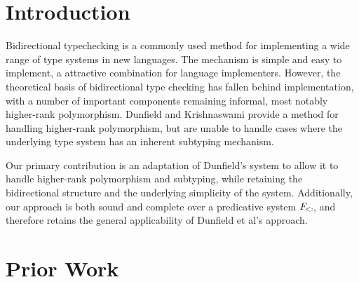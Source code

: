 \documentclass{sig-alternate}
\title{}
\author{
}
\begin{document}
\maketitle
\begin{abstract}

\end{abstract}

\section{Introduction}
Bidirectional typechecking is a commonly used method for implementing a wide range of type systems in new languages. The mechanism is simple and easy to implement, a attractive combination for language implementers. However, the theoretical basis of bidirectional type checking has fallen behind implementation, with a number of important components remaining informal, most notably higher-rank polymorphism. Dunfield and Krishnaswami provide a method for handling higher-rank polymorphism, but are unable to handle cases where the underlying type system has an inherent subtyping mechanism.

Our primary contribution is an adaptation of Dunfield's system to allow it to handle higher-rank polymorphism and subtyping, while retaining the bidirectional structure and the underlying simplicity of the system. Additionally, our approach is both sound and complete over a predicative system $F_{\st}$, and therefore retains the general applicability of Dunfield et al's approach.

\section{Prior Work}


\end{document}
